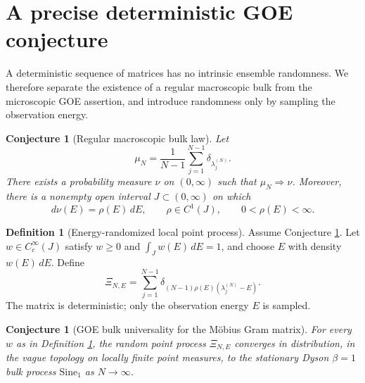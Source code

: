\documentclass[11pt]{amsart}
\numberwithin{equation}{section}
\theoremstyle{plain}
\newtheorem{conjecture}[theorem]{Conjecture}
\theoremstyle{definition}
\newtheorem{definition}[theorem]{Definition}
\theoremstyle{remark}
\begin{document}
\section{A precise deterministic GOE conjecture}
\label{sec:goe_conjecture}

A deterministic sequence of matrices has no intrinsic ensemble randomness.  We therefore separate the existence of a regular macroscopic bulk from the microscopic GOE assertion, and introduce randomness only by sampling the observation energy.

\begin{conjecture}[Regular macroscopic bulk law]
\label{conj:bulk_density}
Let
\begin{equation}
\mu_N=\frac{1}{N-1}\sum_{j=1}^{N-1}\delta_{\lambda_j^{(N)}}.
\label{eq:empirical_spectral_measure}
\end{equation}
There exists a probability measure $\nu$ on $(0,\infty)$ such that $\mu_N\Rightarrow\nu$.  Moreover, there is a nonempty open interval $J\subset(0,\infty)$ on which
\begin{equation}
d\nu(E)=\rho(E)\,dE,
\qquad
\rho\in C^1(J),
\qquad
0<\rho(E)<\infty.
\label{eq:regular_bulk_density}
\end{equation}
\end{conjecture}

\begin{definition}[Energy-randomized local point process]
\label{def:energy_randomized_process}
Assume Conjecture \ref{conj:bulk_density}.  Let $w\in C_c^\infty(J)$ satisfy $w\ge0$ and $\int_Jw(E)\,dE=1$, and choose $E$ with density $w(E)\,dE$.  Define
\begin{equation}
\Xi_{N,E}
=
\sum_{j=1}^{N-1}
\delta_{(N-1)\rho(E)(\lambda_j^{(N)}-E)}.
\label{eq:local_point_process}
\end{equation}
The matrix is deterministic; only the observation energy $E$ is sampled.
\end{definition}

\begin{conjecture}[GOE bulk universality for the M\"obius Gram matrix]
\label{conj:goe_bulk_universality}
For every $w$ as in Definition \ref{def:energy_randomized_process}, the random point process $\Xi_{N,E}$ converges in distribution, in the vague topology on locally finite point measures, to the stationary Dyson $\beta=1$ bulk process $\mathrm{Sine}_1$ as $N\to\infty$.
\label{eq:goe_point_process_convergence}
\end{conjecture}
\end{document}
